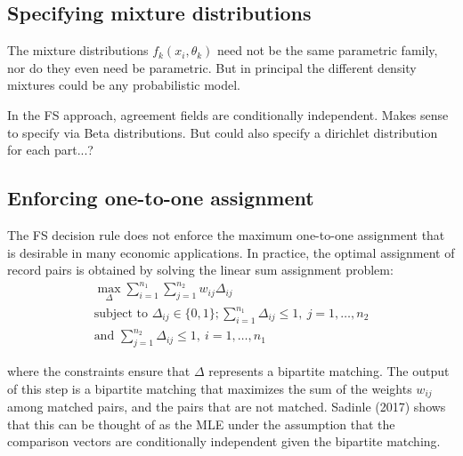 \documentclass[11pt,reqno]{amsart}
\begin{document}
\subsection{Specifying mixture distributions}

The mixture distributions $f_k(x_i,\theta_k)$ need not be the same parametric family, nor do they even need be parametric.  But in principal the different density mixtures could be any probabilistic model.  

In the FS approach, agreement fields are conditionally independent. Makes sense to specify via Beta distributions.  But could also specify a dirichlet distribution for each part...? 

\subsection{Enforcing one-to-one assignment}

The FS decision rule does not enforce the maximum one-to-one assignment that is desirable in many economic applications.  In practice, the optimal assignment of record pairs is obtained by solving the linear sum assignment problem: 
\begin{gather*}
\max_{\Delta} \sum_{i=1}^{n_1}\sum_{j=1}^{n_2} w_{ij} \Delta_{ij}\\
\text{subject to } \Delta_{ij} \in \{0,1\}; \sum_{i=1}^{n_1} \Delta_{ij} \leq 1, \ j=1, \dots, n_2 \\ \text{and } \sum_{j=1}^{n_2} \Delta_{ij} \leq 1, \ i=1, \dots, n_1 
\end{gather*} 

where the constraints ensure that $\Delta$ represents a bipartite matching.  The output of this step is a bipartite matching that maximizes the sum of the weights $w_{ij}$ among matched pairs, and the pairs that are not matched.  Sadinle (2017) shows that this can be thought of as the MLE under the assumption that the comparison vectors are conditionally independent given the bipartite matching. %
\end{document}
